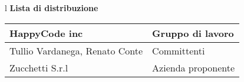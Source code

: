 \begin{center}
\begin{table}[hbtp]
\large{
\begin{tabular}{l}
\Large{\textbf{\textsf{Lista di distribuzione}}} \\
\begin{tabular}{|p{6cm}|p{6cm}|} \hline
{HappyCode inc}& Gruppo di lavoro\\ \hline
{Tullio Vardanega, Renato Conte}& Committenti \\ \hline 
{Zucchetti S.r.l}& Azienda proponente\\ \hline
\end{tabular} \\
\end{tabular}
}
\end{table}
\begin{table}[hbtp]


\end{table}
\end{center}
